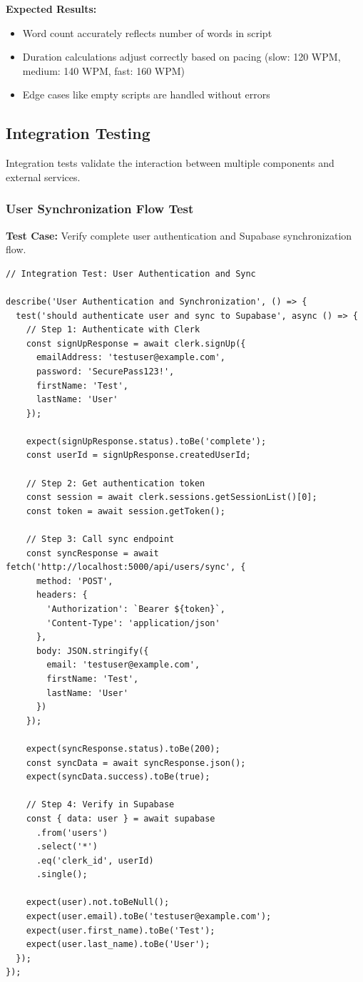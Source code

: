 \textbf{Expected Results:}
\begin{itemize}
    \item Word count accurately reflects number of words in script
    \item Duration calculations adjust correctly based on pacing (slow: 120 WPM, medium: 140 WPM, fast: 160 WPM)
    \item Edge cases like empty scripts are handled without errors
\end{itemize}

\subsection{Integration Testing}

Integration tests validate the interaction between multiple components and external services.

\subsubsection{User Synchronization Flow Test}

\textbf{Test Case:} Verify complete user authentication and Supabase synchronization flow.

\begin{verbatim}
// Integration Test: User Authentication and Sync

describe('User Authentication and Synchronization', () => {
  test('should authenticate user and sync to Supabase', async () => {
    // Step 1: Authenticate with Clerk
    const signUpResponse = await clerk.signUp({
      emailAddress: 'testuser@example.com',
      password: 'SecurePass123!',
      firstName: 'Test',
      lastName: 'User'
    });
    
    expect(signUpResponse.status).toBe('complete');
    const userId = signUpResponse.createdUserId;
    
    // Step 2: Get authentication token
    const session = await clerk.sessions.getSessionList()[0];
    const token = await session.getToken();
    
    // Step 3: Call sync endpoint
    const syncResponse = await fetch('http://localhost:5000/api/users/sync', {
      method: 'POST',
      headers: {
        'Authorization': `Bearer ${token}`,
        'Content-Type': 'application/json'
      },
      body: JSON.stringify({
        email: 'testuser@example.com',
        firstName: 'Test',
        lastName: 'User'
      })
    });
    
    expect(syncResponse.status).toBe(200);
    const syncData = await syncResponse.json();
    expect(syncData.success).toBe(true);
    
    // Step 4: Verify in Supabase
    const { data: user } = await supabase
      .from('users')
      .select('*')
      .eq('clerk_id', userId)
      .single();
    
    expect(user).not.toBeNull();
    expect(user.email).toBe('testuser@example.com');
    expect(user.first_name).toBe('Test');
    expect(user.last_name).toBe('User');
  });
});
\end{verbatim}


